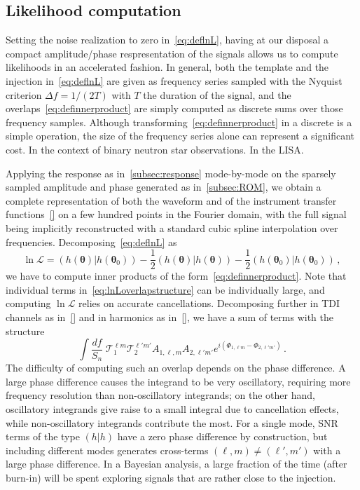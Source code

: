 \documentclass[aps,showpacs,twocolumn,prd,superscriptaddress,nofootinbib]{revtex4-1}
\newcommand{\be}{\begin{equation}}
\newcommand{\ee}{\end{equation}}
\newcommand\calT{{\mathcal{T}}}
\newcommand\calL{{\mathcal{L}}}
\begin{document}

\subsection{Likelihood computation}
\label{sec:likelihood}

Setting the noise realization to zero in~\eqref{eq:deflnL}, having at our disposal a compact amplitude/phase respresentation of the signals allows us to compute likelihoods in an accelerated fashion. In general, both the template and the injection in~\eqref{eq:deflnL} are given as frequency series sampled with the Nyquist criterion $\Delta f = 1/(2T)$ with $T$ the duration of the signal, and the overlaps~\eqref{eq:definnerproduct} are simply computed as discrete sums over those frequency samples. Although transforming~\eqref{eq:definnerproduct} in a discrete is a simple operation, the size of the frequency series alone can represent a significant cost. In the context of binary neutron star observations. In the LISA.

Applying the response as in~\ref{subsec:response} mode-by-mode on the sparsely sampled amplitude and phase generated as in~\ref{subsec:ROM}, we obtain a complete representation of both the waveform and of the instrument transfer functions~\eqref{} on a few hundred points in the Fourier domain, with the full signal being implicitly reconstructed with a standard cubic spline interpolation over frequencies. Decomposing~\eqref{eq:deflnL} as
\be\label{eq:lnLoverlapstructure}
	\ln \calL = \left( h(\bm{\theta}) | h(\bm{\theta}_{0}) \right)- \frac{1}{2} \left( h(\bm{\theta}) | h(\bm{\theta}) \right) - \frac{1}{2} \left( h(\bm{\theta}_{0}) | h(\bm{\theta}_{0}) \right) \,,
\ee
we have to compute inner products of the form~\eqref{eq:definnerproduct}. Note that individual terms in~\eqref{eq:lnLoverlapstructure} can be individually large, and computing $\ln \calL$ relies on accurate cancellations. Decomposing further in TDI channels as in~\eqref{} and in harmonics as in~\eqref{}, we have a sum of terms with the structure
\be
	\int \frac{df}{S_{n}} \; \calT_{1}^{\ell m} \calT_{2}^{\ell' m'} A_{1,\ell, m} A_{2, \ell' m'} e^{i(\Phi_{1,\ell m} - \Phi_{2,\ell' m'})} \,.
\ee
The difficulty of computing such an overlap depends on the phase difference. A large phase difference causes the integrand to be very oscillatory, requiring more frequency resolution than non-oscillatory integrands; on the other hand, oscillatory integrands give raise to a small integral due to cancellation effects, while non-oscillatory integrands contribute the most. For a single mode, SNR terms of the type $(h|h)$ have a zero phase difference by construction, but including different modes generates cross-terms $(\ell, m) \neq (\ell', m')$ with a large phase difference. In a Bayesian analysis, a large fraction of the time (after burn-in) will be spent exploring signals that are rather close to the injection.
\end{document}
